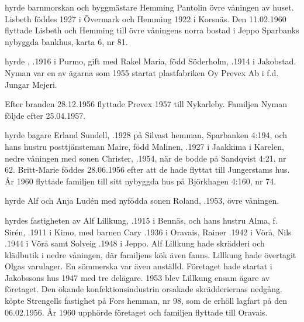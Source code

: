  hyrde barnmorskan  och byggmästare Hemming Pantolin övre våningen av huset. Lisbeth föddes 1927 i Övermark och Hemming 1922 i Korsnäs. Den 11.02.1960 flyttade Lisbeth och Hemming till övre våningens norra bostad i Jeppo Sparbanks nybyggda bankhus, karta 6, nr 81.

 hyrde , .1916 i Purmo, gift med Rakel Maria, född Söderholm, .1914 i Jakobstad. Nyman var en av ägarna som 1955 startat plastfabriken Oy Prevex Ab i f.d. Jungar Mejeri.
\begin{jhchildren}
  \item {}
  \item {}
  \item {}
  \item {}
\end{jhchildren}
Efter branden 28.12.1956 flyttade Prevex 1957 till Nykarleby. Familjen Nyman följde efter 25.04.1957.

 hyrde bagare Erland Sundell, .1928 på Silvast hemman, Sparbanken 4:194, och hans hustru posttjänsteman Maire, född Malinen, .1927 i Jaakkima i Karelen, nedre våningen med sonen Christer, .1954, när de bodde på Sandqvist 4:21, nr 62.  Britt-Marie föddes 28.06.1956 efter att de hade flyttat till Jungerstams hus. År 1960 flyttade familjen till sitt nybyggda hus på Björkhagen 4:160, nr 74.

 hyrde Alf och Anja Ludén med nyfödda sonen Roland, .1953, övre våningen.

 hyrdes fastigheten av Alf Lillkung, .1915  i Bennäs, och hans hustru Alma, f. Sirén, .1911 i Kimo, med barnen Cary .1936 i Oravais, Rainer .1942 i Vörå, Nils .1944 i Vörå samt Solveig .1948 i Jeppo. Alf Lillkung hade skrädderi och klädbutik i nedre våningen, där familjens kök även fanns.  Lillkung hade övertagit Olgas varulager. En sömmerska var även anställd. Företaget hade startat i Jakobssons hus 1947 med tre delägare. 1953 blev Lillkung ensam ägare av företaget. Den ökande konfektionsindustrin orsakade skrädderiernas nedgång.  köpte Strengells fastighet på Fors hemman, nr 98, som de erhöll lagfart på den 06.02.1956. År 1960 upphörde företaget och familjen flyttade till Oravais.

